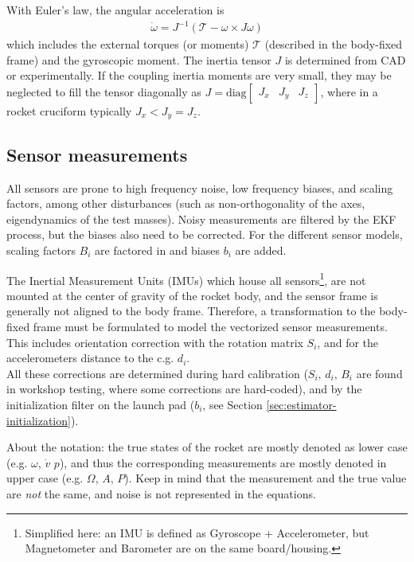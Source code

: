 With Euler's law, the angular acceleration is \cite{zipfel2007, schiehlen2017}
\begin{align}
   \dot \omega = J^{-1} (\mathcal{T} - \omega \times J \omega)
   \label{eq:model-rate-deriv}
\end{align}
which includes the external torques (or moments) $\mathcal{T}$ (described in the body-fixed frame) and the gyroscopic moment.
The inertia tensor $J$ is determined from CAD or experimentally. If the coupling inertia moments are very small, they may be neglected to fill the tensor diagonally as $J = \text{diag}\begin{bmatrix} J_x & J_y & J_z \end{bmatrix}$, where in a rocket cruciform typically $ J_x < J_y = J_z$.

\subsection{Sensor measurements}
\label{sec:model-measurements}
All sensors are prone to high frequency noise, low frequency biases, and scaling factors, among other disturbances (such as non-orthogonality of the axes, eigendynamics of the test masses).
Noisy measurements are filtered by the EKF process, but the biases also need to be corrected.
For the different sensor models, scaling factors $B_i$ are factored in and biases $b_i$ are added. 

The Inertial Measurement Units (IMUs) which house all sensors\footnote{Simplified here: an IMU is defined as Gyroscope + Accelerometer, but Magnetometer and Barometer are on the same board/housing.}, are not mounted at the center of gravity of the rocket body, and the sensor frame is generally not aligned to the body frame.
Therefore, a transformation to the body-fixed frame must be formulated to model the vectorized sensor measurements.
This includes orientation correction with the rotation matrix $S_i$, and for the accelerometers distance to the c.g. $d_i$. \\
All these corrections are determined during hard calibration ($S_i, \, d_i, \, B_i$ are found in workshop testing, where some corrections are hard-coded), and by the initialization filter on the launch pad ($b_i$, see Section \ref{sec:estimator-initialization}).

About the notation: the true states of the rocket are mostly denoted as lower case (e.g. $\omega$, $\dot v$ $p$), and thus the corresponding measurements are mostly denoted in upper case (e.g. $\Omega$, $A$, $P$).  
Keep in mind that the measurement and the true value are \textit{not} the same, and noise is not represented in the equations.


